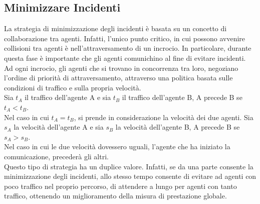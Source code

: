 \documentclass[a4paper,10pt]{article}
\begin{document}
    \subsection{Minimizzare Incidenti}
    La strategia di minimizzazione degli incidenti è basata su un concetto di
    collaborazione tra agenti. Infatti, l'unico punto critico, in cui possono
    avvenire collisioni tra agenti è nell'attraversamento di un incrocio. In
    particolare, durante questa fase è importante che gli agenti comunichino al
    fine di evitare incidenti. Ad ogni incrocio, gli agenti che si trovano in
    concorrenza tra loro, negoziano l'ordine di priorità di attraversamento,
    attraverso una politica basata sulle condizioni di traffico e sulla propria
    velocità.\\
    Sia $t_A$ il traffico dell'agente A e sia $t_B$ il traffico dell'agente B, A
    precede B se $t_A < t_B$.\\
    Nel caso in cui $t_A = t_B$, si prende in considerazione la velocità dei
    due agenti. Sia $s_A$ la velocità dell'agente A e sia $s_B$ la velocità
    dell'agente B, A precede B se $s_A > s_B$.\\
    Nel caso in cui le due velocità dovessero uguali, l'agente che ha iniziato
    la comunicazione, precederà gli altri.\\    
    Questo tipo di strategia ha un duplice valore. Infatti, se da una
    parte consente la minimizzazione degli incidenti, allo stesso tempo consente
    di evitare ad agenti con poco traffico nel proprio percorso, di attendere a 
    lungo per agenti con tanto traffico, ottenendo un miglioramento della misura
    di prestazione globale.
    
\end{document}
